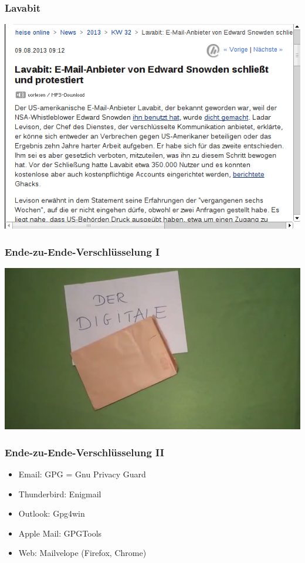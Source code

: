\documentclass[12pt]{beamer}
\begin{document}
\begin{frame}
    \frametitle{Lavabit}
    \includegraphics[height=0.6\textheight]{img/heise_lavabit.png}
\end{frame}

\begin{frame}
  \frametitle{Ende-zu-Ende-Verschlüsselung I}
  \includegraphics[height=0.6\textheight]{img/gpgvideo.png}
\end{frame}

\begin{frame}
    \frametitle{Ende-zu-Ende-Verschlüsselung II}
    \begin{itemize}\Large
      \item Email: GPG = Gnu Privacy Guard
      \item Thunderbird: Enigmail
      \item Outlook: Gpg4win
      \item Apple Mail: GPGTools
      \item Web: Mailvelope (Firefox, Chrome)
    \end{itemize}
\end{frame}
\end{document}

